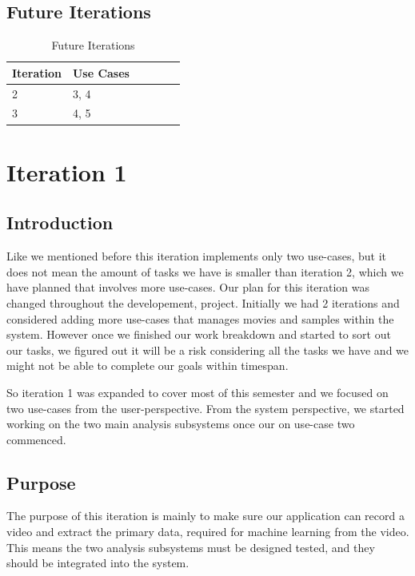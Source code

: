 \documentclass[12pt,a4paper,man]{report}
\begin{document}
\section{Future Iterations}
\label{sec:org01940e0}

\begin{table}[htbp]
\caption{\label{table:fuiterplan}
Future Iterations}
\centering
\begin{tabular}{|l|l|l|l|lp{3cm}|}
\hline
\textbf{Iteration} & \textbf{Use Cases} \footnotemark\\
\hline
2 & 3, 4\\
3 & 4, 5\\
\hline
\end{tabular}
\end{table}


\chapter{Iteration 1}
\label{sec:org177d2dc}
\section{Introduction}
\label{sec:org1edc205}
Like we mentioned before this iteration implements only two use-cases, but it does not mean the amount of tasks we have is smaller than iteration 2, which we have planned that involves more use-cases. Our plan for this iteration was changed throughout the developement, project. Initially we had 2 iterations and considered adding more use-cases that manages movies and samples within the system. However once we finished our work breakdown and started to sort out our tasks, we figured out it will be a risk considering all the tasks we have and we might not be able to complete our goals within timespan. 

So iteration 1 was expanded to cover most of this semester and we focused on two use-cases from the user-perspective. From the system perspective, we started working on the two main analysis subsystems once our on use-case two commenced.


\section{Purpose}
\label{sec:org5c8b096}
The purpose of this iteration is mainly to make sure our application can record a video and extract the primary data, required for machine learning from the video. This means the two analysis subsystems must be designed tested, and they should be integrated into the system.
\end{document}
